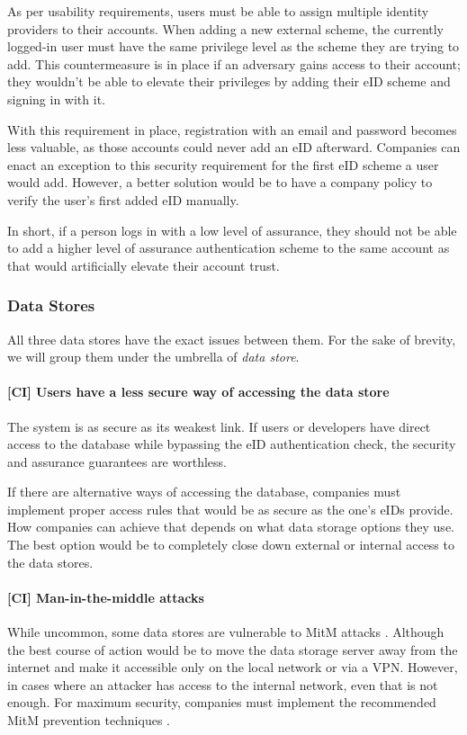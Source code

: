 As per usability requirements, users must be able to assign multiple identity providers to their accounts. When adding a new external scheme, the currently logged-in user must have the same privilege level as the scheme they are trying to add. This countermeasure is in place if an adversary gains access to their account; they wouldn't be able to elevate their privileges by adding their eID scheme and signing in with it.

With this requirement in place, registration with an email and password becomes less valuable, as those accounts could never add an eID afterward. Companies can enact an exception to this security requirement for the first eID scheme a user would add. However, a better solution would be to have a company policy to verify the user's first added eID manually.

In short, if a person logs in with a low level of assurance, they should not be able to add a higher level of assurance authentication scheme to the same account as that would artificially elevate their account trust.

\subsubsection{Data Stores}

All three data stores have the exact issues between them. For the sake of brevity, we will group them under the umbrella of \textit{data store}.

\paragraph{[CI] Users have a less secure way of accessing the data store}

The system is as secure as its weakest link. If users or developers have direct access to the database while bypassing the eID authentication check, the security and assurance guarantees are worthless.

If there are alternative ways of accessing the database, companies must implement proper access rules that would be as secure as the one's eIDs provide. How companies can achieve that depends on what data storage options they use. The best option would be to completely close down external or internal access to the data stores.

\paragraph{[CI] Man-in-the-middle attacks} While uncommon, some data stores are vulnerable to MitM attacks \cite{sql-server-auth-mitm}. Although the best course of action would be to move the data storage server away from the internet and make it accessible only on the local network or via a VPN. However, in cases where an attacker has access to the internal network, even that is not enough. For maximum security, companies must implement the recommended MitM prevention techniques \cite{sql-server-enable-tls}.

